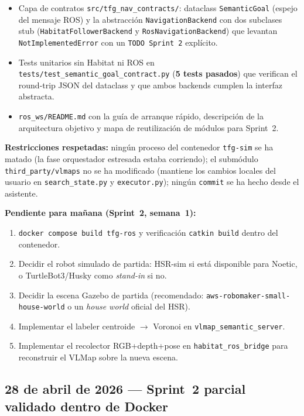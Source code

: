 \documentclass[11pt,a4paper]{article}
\begin{document}
\begin{itemize}
        módulos Python existentes que envolverá Sprint~2.
  \item Capa de contratos \texttt{src/tfg\_nav\_contracts/}: dataclass
        \texttt{SemanticGoal} (espejo del mensaje ROS) y la
        abstracción \texttt{NavigationBackend} con dos subclases stub
        (\texttt{HabitatFollowerBackend} y
        \texttt{RosNavigationBackend}) que levantan
        \texttt{NotImplementedError} con un \texttt{TODO Sprint~2}
        explícito.
  \item Tests unitarios sin Habitat ni ROS en
        \texttt{tests/test\_semantic\_goal\_contract.py}
        (\textbf{5 tests pasados}) que verifican el round-trip
        JSON del dataclass y que ambos backends cumplen la interfaz
        abstracta.
  \item \texttt{ros\_ws/README.md} con la guía de arranque rápido,
        descripción de la arquitectura objetivo y mapa de
        reutilización de módulos para Sprint~2.
\end{itemize}

\textbf{Restricciones respetadas:} ningún proceso del contenedor
\texttt{tfg-sim} se ha matado (la fase orquestador estresada estaba
corriendo); el submódulo \texttt{third\_party/vlmaps} no se ha
modificado (mantiene los cambios locales del usuario en
\texttt{search\_state.py} y \texttt{executor.py}); ningún
\texttt{commit} se ha hecho desde el asistente.

\textbf{Pendiente para mañana (Sprint~2, semana~1):}
\begin{enumerate}
  \item \texttt{docker compose build tfg-ros} y verificación
        \texttt{catkin build} dentro del contenedor.
  \item Decidir el robot simulado de partida: HSR-sim si está
        disponible para Noetic, o TurtleBot3/Husky como \emph{stand-in}
        si no.
  \item Decidir la escena Gazebo de partida (recomendado:
        \texttt{aws-robomaker-small-house-world} o un \emph{house
        world} oficial del HSR).
  \item Implementar el labeler centroide $\rightarrow$ Voronoi en
        \texttt{vlmap\_semantic\_server}.
  \item Implementar el recolector RGB+depth+pose en
        \texttt{habitat\_ros\_bridge} para reconstruir el VLMap sobre
        la nueva escena.
\end{enumerate}

\subsection*{28 de abril de 2026 --- Sprint~2 parcial validado dentro de Docker}
\end{document}
